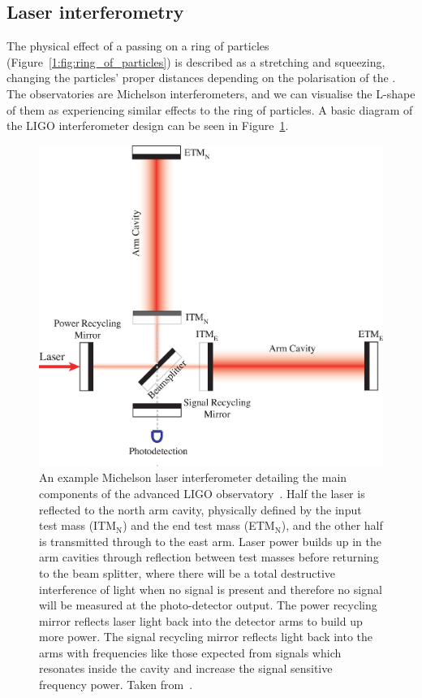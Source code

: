 \subsection{\label{1:sec:laser_interferometry}Laser interferometry}

The physical effect of a passing \gw on a ring of particles (Figure~\ref{1:fig:ring_of_particles}) is described as a stretching and squeezing, changing the particles' proper distances depending on the polarisation of the \gw. The \gwadj observatories are Michelson interferometers, and we can visualise the L-shape of them as experiencing similar effects to the ring of particles. A basic diagram of the LIGO interferometer design can be seen in Figure~\ref{1:fig:ifo}.
%
\begin{figure}
    \centering
    \includegraphics[width=0.9\linewidth]{images/1_general_relativity/gravitational_wave_detection/IFO.eps}
    \caption{An example Michelson laser interferometer detailing the main components of the advanced LIGO \gwadj observatory~\cite{aLIGO:2015}. Half the laser is reflected to the north arm cavity, physically defined by the input test mass (ITM$_{\text{N}}$) and the end test mass (ETM$_{\text{N}}$), and the other half is transmitted through to the east arm. Laser power builds up in the arm cavities through reflection between test masses before returning to the beam splitter, where there will be a total destructive interference of light when no \gwadj signal is present and therefore no signal will be measured at the photo-detector output. The power recycling mirror reflects laser light back into the detector arms to build up more power. The signal recycling mirror reflects light back into the arms with frequencies like those expected from \gwadj signals which resonates inside the cavity and increase the signal sensitive frequency power. Taken from~\cite{IFO_diagram:2008}.}
    \label{1:fig:ifo}
\end{figure}
%

